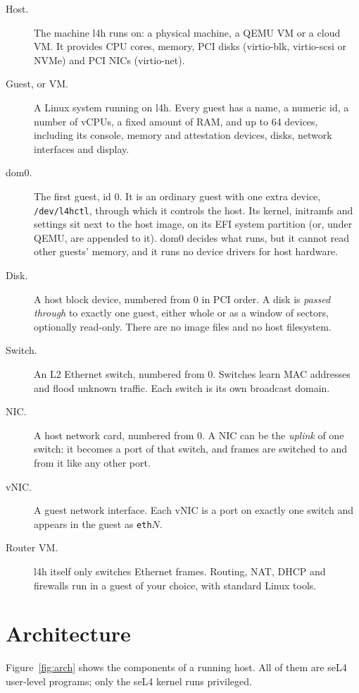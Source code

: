 \documentclass[11pt,a4paper]{report}
\newcommand{\file}[1]{\texttt{#1}}
\begin{document}
\begin{description}
  \item[Host.] The machine l4h runs on: a physical machine, a QEMU VM or a
    cloud VM. It provides CPU cores, memory, PCI disks (virtio-blk, virtio-scsi or NVMe)
    and PCI NICs (virtio-net).
  \item[Guest, or VM.] A Linux system running on l4h. Every guest has a
    name, a numeric id, a number of vCPUs, a fixed amount of RAM, and up to
    64 devices, including its console, memory and attestation devices,
    disks, network interfaces and display.
  \item[dom0.] The first guest, id 0. It is an ordinary guest with one
    extra device, \file{/dev/l4hctl}, through which it controls the host. Its
    kernel, initramfs and settings sit next to the host image, on its EFI
    system partition (or, under QEMU, are appended to it). dom0 decides
    what runs, but it cannot read other guests' memory, and it runs no device
    drivers for host hardware.
  \item[Disk.] A host block device, numbered from 0 in PCI order. A disk is
    \emph{passed through} to exactly one guest, either whole or as a window
    of sectors, optionally read-only. There are no image files and no host
    filesystem.
  \item[Switch.] An L2 Ethernet switch, numbered from 0. Switches learn MAC
    addresses and flood unknown traffic. Each switch is its own broadcast
    domain.
  \item[NIC.] A host network card, numbered from 0. A NIC can be the
    \emph{uplink} of one switch: it becomes a port of that switch, and frames
    are switched to and from it like any other port.
  \item[vNIC.] A guest network interface. Each vNIC is a port on exactly one
    switch and appears in the guest as \texttt{eth}$N$.
  \item[Router VM.] l4h itself only switches Ethernet frames. Routing, NAT,
    DHCP and firewalls run in a guest of your choice, with standard Linux
    tools.
\end{description}

\section{Architecture}

Figure~\ref{fig:arch} shows the components of a running host. All of them
are seL4 user-level programs; only the seL4 kernel runs privileged.
\end{document}
